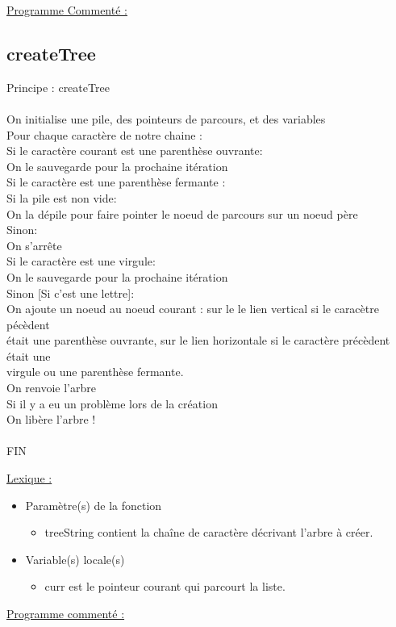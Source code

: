 \documentclass[a4paper]{article}
\newcommand\tab[1][1cm]{\hspace*{#1}}
\begin{document}
\underline{Programme Commenté :}



\subsection{createTree}
\begin{algorithm}
Principe : createTree
\\
\\
\tab On initialise une pile, des pointeurs de parcours, et des variables
\\
\tab Pour chaque caractère de notre chaine :
\\
\tab \tab Si le caractère courant est une parenthèse ouvrante:
\\
\tab \tab \tab On le sauvegarde pour la prochaine itération
\\
\tab \tab Si le caractère est une parenthèse fermante :
\\
\tab \tab \tab Si la pile est non vide:
\\
\tab \tab \tab \tab On la dépile pour faire pointer le noeud de parcours sur un noeud père
\\
\tab \tab \tab Sinon:
\\
\tab \tab \tab \tab On s'arrête
\\
\tab \tab Si le caractère est une virgule:
\\
\tab \tab \tab On le sauvegarde pour la prochaine itération
\\
\tab \tab Sinon [Si c'est une lettre]:
\\
\tab \tab \tab On ajoute un noeud au noeud courant : sur le le lien vertical si le caracètre pécèdent 
\\
\tab \tab \tab était une parenthèse ouvrante, sur le lien horizontale si le caractère précèdent était une
\\
\tab \tab \tab virgule ou une parenthèse fermante.
\\
\tab On renvoie l'arbre
\\
\tab Si il y a eu un problème lors de la création
\\
\tab \tab On libère l'arbre !
\\
\\
FIN
\end{algorithm}
\underline{Lexique :}
\begin{itemize}
\item Paramètre(s) de la fonction  
\begin{itemize}
\item treeString contient la chaîne de caractère décrivant l'arbre à créer.
\end{itemize}
\item Variable(s) locale(s)
\begin{itemize}
\item curr est le pointeur courant qui parcourt la liste.
\end{itemize}
\end{itemize}
\underline{Programme commenté :}
\end{document}
